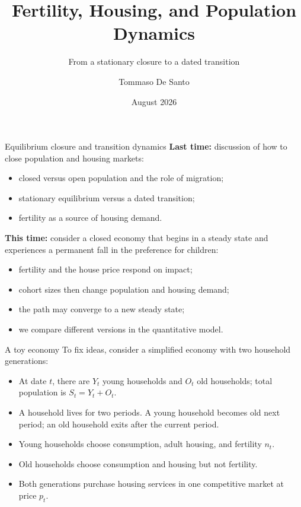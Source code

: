 \documentclass[11pt,aspectratio=169]{beamer}
\title{Fertility, Housing, and Population Dynamics}
\subtitle{From a stationary closure to a dated transition}
\author{Tommaso De Santo}
\date{August 2026}
\begin{document}
{
\begin{frame}[plain,c]
  \titlepage
\end{frame}
}

\begin{frame}{Equilibrium closure and transition dynamics}
\textbf{Last time:} discussion of how to close population and housing markets:
\begin{itemize}
  \item closed versus open population and the role of migration;
  \item stationary equilibrium versus a dated transition;
  \item fertility as a source of housing demand.
\end{itemize}

\medskip
\textbf{This time:} consider a closed economy that begins in a steady state and experiences a permanent fall in the preference for children:
\begin{itemize}
  \item fertility and the house price respond on impact;
  \item cohort sizes then change population and housing demand;
  \item the path may converge to a new steady state;
  \item we compare different versions in the quantitative model.
\end{itemize}

\end{frame}

\begin{frame}{A toy economy}
\small
To fix ideas, consider a simplified economy with two household generations:
\begin{itemize}
  \item At date $t$, there are $Y_t$ young households and $O_t$ old households; total population is $S_t=Y_t+O_t$.
  \item A household lives for two periods. A young household becomes old next period; an old household exits after the current period.
  \item Young households choose consumption, adult housing, and fertility $n_t$.
  \item Old households choose consumption and housing but not fertility.
  \item Both generations purchase housing services in one competitive market at price $p_t$.
\end{itemize}

\end{frame}
\end{document}
